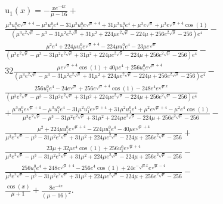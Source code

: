 \documentclass[12pt, a4paper]{article} %
\begin{document}
\begin{multline*}
    \operatorname{u_{1}}{\left(x \right)} = - \frac{x e^{- 4 x}}{\mu - 16} +\\
\frac{\mu^{3} u^{0}_{1} e^{\sqrt{\mu} + 4} - \mu^{3} u^{0}_{1} e^{4} - 31 \mu^{2} u^{0}_{1} e^{\sqrt{\mu} + 4} + 31 \mu^{2} u^{0}_{1} e^{4} + \mu^{2} e^{\sqrt{\mu}} + \mu^{2} e^{\sqrt{\mu} + 4} \cos{\left(1 \right)}}{{\left(\mu^{3} e^{2 \sqrt{\mu}} - \mu^{3} - 31 \mu^{2} e^{2 \sqrt{\mu}} + 31 \mu^{2} + 224 \mu e^{2 \sqrt{\mu}} - 224 \mu + 256 e^{2 \sqrt{\mu}} - 256\right) e^{4}}} -\\
\frac{\mu^{2} e^{4} + 224 \mu u^{0}_{1} e^{\sqrt{\mu} + 4} - 224 \mu u^{0}_{1} e^{4} - 23 \mu e^{\sqrt{\mu}}}{{\left(\mu^{3} e^{2 \sqrt{\mu}} - \mu^{3} - 31 \mu^{2} e^{2 \sqrt{\mu}} + 31 \mu^{2} + 224 \mu e^{2 \sqrt{\mu}} - 224 \mu + 256 e^{2 \sqrt{\mu}} - 256\right) e^{4}}} -\\
32 \frac{\mu e^{\sqrt{\mu} + 4} \cos{\left(1 \right)} + 40 \mu e^{4} + 256 u^{0}_{1} e^{\sqrt{\mu} + 4}}{{\left(\mu^{3} e^{2 \sqrt{\mu}} - \mu^{3} - 31 \mu^{2} e^{2 \sqrt{\mu}} + 31 \mu^{2} + 224 \mu e^{2 \sqrt{\mu}} - 224 \mu + 256 e^{2 \sqrt{\mu}} - 256\right) e^{4}}} -\\
\frac{256 u^{0}_{1} e^{4} - 24 e^{\sqrt{\mu}} + 256 e^{\sqrt{\mu} + 4} \cos{\left(1 \right)} - 248 e^{4} e^{\sqrt{\mu} x}}{\left(\mu^{3} e^{2 \sqrt{\mu}} - \mu^{3} - 31 \mu^{2} e^{2 \sqrt{\mu}} + 31 \mu^{2} + 224 \mu e^{2 \sqrt{\mu}} - 224 \mu + 256 e^{2 \sqrt{\mu}} - 256\right) e^{4}}\\
    + \frac{\mu^{3} u^{0}_{1} e^{\sqrt{\mu} + 4} - \mu^{3} u^{0}_{1} e^{4} - 31 \mu^{2} u^{0}_{1} e^{\sqrt{\mu} + 4} + 31 \mu^{2} u^{0}_{1} e^{4} + \mu^{2} e^{\sqrt{\mu} + 4} - \mu^{2} e^{4} \cos{\left(1 \right)}}{\mu^{3} e^{2 \sqrt{\mu}} - \mu^{3} - 31 \mu^{2} e^{2 \sqrt{\mu}} + 31 \mu^{2} + 224 \mu e^{2 \sqrt{\mu}} - 224 \mu + 256 e^{2 \sqrt{\mu}} - 256} -\\
\frac{\mu^{2} + 224 \mu u^{0}_{1} e^{\sqrt{\mu} + 4} - 224 \mu u^{0}_{1} e^{4} - 40 \mu e^{\sqrt{\mu} + 4}}{\mu^{3} e^{2 \sqrt{\mu}} - \mu^{3} - 31 \mu^{2} e^{2 \sqrt{\mu}} + 31 \mu^{2} + 224 \mu e^{2 \sqrt{\mu}} - 224 \mu + 256 e^{2 \sqrt{\mu}} - 256} +\\
\frac{23 \mu + 32 \mu e^{4} \cos{\left(1 \right)} + 256 u^{0}_{1} e^{\sqrt{\mu} + 4}}{\mu^{3} e^{2 \sqrt{\mu}} - \mu^{3} - 31 \mu^{2} e^{2 \sqrt{\mu}} + 31 \mu^{2} + 224 \mu e^{2 \sqrt{\mu}} - 224 \mu + 256 e^{2 \sqrt{\mu}} - 256} -\\
\frac{256 u^{0}_{1} e^{4} + 248 e^{\sqrt{\mu} + 4} - 256 e^{4} \cos{\left(1 \right)} + 24 e^{- \sqrt{\mu} x} e^{\sqrt{\mu} - 4}}{\mu^{3} e^{2 \sqrt{\mu}} - \mu^{3} - 31 \mu^{2} e^{2 \sqrt{\mu}} + 31 \mu^{2} + 224 \mu e^{2 \sqrt{\mu}} - 224 \mu + 256 e^{2 \sqrt{\mu}} - 256} -\\
    \frac{\cos{\left(x \right)}}{\mu + 1} + \frac{8 e^{- 4 x}}{\left(\mu - 16\right)^{2}}
.\end{multline*}
\end{document}
